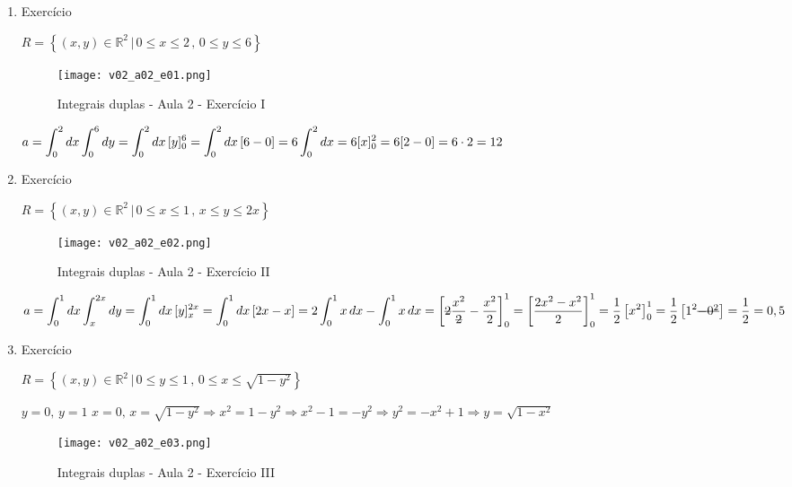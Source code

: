 \begin{enumerate}
	\item Exercício
	
	$R = \left\{(x, y) \in \mathbb{R}^2 \,|\, 0 \leq x \leq 2 \,,\, 0 \leq y \leq 6 \right\}$
	
	\begin{figure}[H]
		\centering
		\texttt{[image: v02\_a02\_e01.png]}
		\caption{Integrais duplas - Aula 2 - Exercício I}
		\label{v02_a02_e01}
	\end{figure}
	
	$a = \displaystyle\int_0^2 dx \displaystyle\int_0^6 dy = \displaystyle\int_0^2 dx\, [y]_0^6 = \displaystyle\int_0^2 dx\, [6 - 0] = 6\displaystyle\int_0^2 dx = 6[x]_0^2 = 6[2 - 0] = 6 \cdot 2 = 12 $\newline
	
	\item Exercício
	
	$R = \left\{(x, y) \in \mathbb{R}^2 \,|\, 0 \leq x \leq 1 \,,\, x \leq y \leq 2x \right\}$
						
	\begin{figure}[H]
		\centering
		\texttt{[image: v02\_a02\_e02.png]}
		\caption{Integrais duplas - Aula 2 - Exercício II}
		\label{v02_a02_e02}
	\end{figure}
	
	$a = \integral_0^1 dx \integral_{x}^{2x} dy = \integral_0^1 dx\, [y]_{x}^{2x} = \integral_0^1 dx\, [2x - x] = 2\integral_0^1 x\, dx - \integral_0^1 x\, dx = \left[\overstrike{2}\dfrac{x^2}{\overstrike{2}} - \dfrac{x^2}{2}\right]_0^1 = \left[\dfrac{2x^2 - x^2}{2}\right]_0^1 = \dfrac{1}{2}\left[x^2\right]_0^1 = \dfrac{1}{2}\left[1^2 \overstrike{- 0^2}\right] = \dfrac{1}{2} = 0,5 $\newline
	
	\item Exercício
	
	$R = \left\{(x, y) \in \mathbb{R}^2 \,|\, 0 \leq y \leq 1 \,,\, 0 \leq x \leq \sqrt{1 - y^2} \right\}$
	
	$y = 0,\, y=1$\newline
	$x = 0,\, x = \sqrt{1 - y^2} \Rightarrow x^2 = 1 - y^2 \Rightarrow x^2 - 1 = -y^2 \Rightarrow y^2 = -x^2 + 1 \Rightarrow y = \sqrt{1 -x^2}$
					
	\begin{figure}[H]
		\centering
		\texttt{[image: v02\_a02\_e03.png]}
		\caption{Integrais duplas - Aula 2 - Exercício III}
		\label{v02_a02_e03}
	\end{figure}
	

\end{enumerate}
